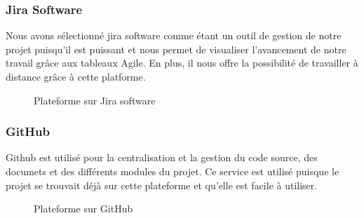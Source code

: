 	\subsubsection{Jira Software}
	Nous avons sélectionné jira software comme étant un outil de gestion de notre projet puisqu'il est  puissant et nous permet de visualiser l'avancement de notre travail grâce aux tableaux Agile. En plus, il nous offre la possibilité de travailler à distance grâce à cette platforme.
	\begin{figure}[h]
		\begin{center}
			\centering
		\end{center}
		\caption{Plateforme sur Jira software}
	\end{figure}
	\subsubsection{GitHub}
	Github est utilisé pour la centralisation et la gestion du code source, des documets et des différents modules du projet. Ce service est utilisé puisque le projet se trouvait déjà sur cette plateforme et qu’elle est facile à utiliser.
	\begin{figure}[h]
		\begin{center}
			\centering
		\end{center}
		\caption{Plateforme sur GitHub}
	\end{figure}

